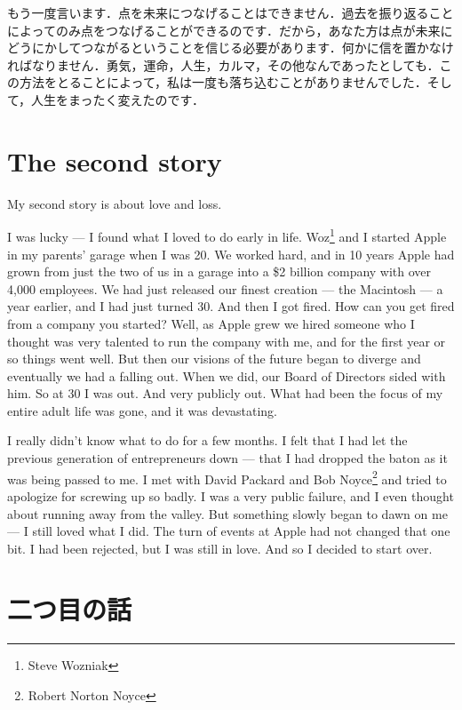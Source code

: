 \documentclass[twocolumn]{jsarticle}
\begin{document}
\newpage

もう一度言います．点を未来につなげることはできません．過去を振り返ることによってのみ点をつなげることができるのです．だから，あなた方は点が未来にどうにかしてつながるということを信じる必要があります．何かに信を置かなければなりません．勇気，運命，人生，カルマ，その他なんであったとしても．この方法をとることによって，私は一度も落ち込むことがありませんでした．そして，人生をまったく変えたのです．

\newpage

\section*{The second story}

My second story is about love and loss.

I was lucky — I found what I loved to do early in life. Woz\footnote{Steve Wozniak} and I started Apple in my parents' garage when I was 20. We worked hard, and in 10 years Apple had grown from just the two of us in a garage into a \$2 billion company with over 4,000 employees. We had just released our finest creation — the Macintosh — a year earlier, and I had just turned 30. And then I got fired. How can you get fired from a company you started? Well, as Apple grew we hired someone who I thought was very talented to run the company with me, and for the first year or so things went well. But then our visions of the future began to diverge and eventually we had a falling out. When we did, our Board of Directors sided with him. So at 30 I was out. And very publicly out. What had been the focus of my entire adult life was gone, and it was devastating.

\vspace{\baselineskip}
\vspace{\baselineskip}

I really didn't know what to do for a few months. I felt that I had let the previous generation of entrepreneurs down — that I had dropped the baton as it was being passed to me. I met with David Packard and Bob Noyce\footnote{Robert Norton Noyce} and tried to apologize for screwing up so badly. I was a very public failure, and I even thought about running away from the valley. But something slowly began to dawn on me — I still loved what I did. The turn of events at Apple had not changed that one bit. I had been rejected, but I was still in love. And so I decided to start over.

\newpage

\section*{二つ目の話}
\end{document}
